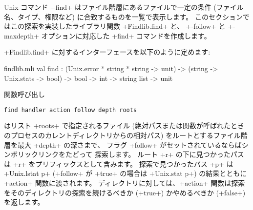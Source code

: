 Unix コマンド \ml+find+ はファイル階層にあるファイルで一定の条件 (ファイル名、タイプ、権限など)
に合致するものを一覧で表示します。
このセクションではこの探索を実装したライブラリ関数 \ml+Findlib.find+ と、
\ml+-follow+ と \ml+-maxdepth+ オプションに対応した \ml+find+ コマンドを作成します。

\ml+Findlib.find+ に対するインターフェースを以下のように定めます:
%
\begin{listingcodefile}{findlib.mli}
val find :
  (Unix.error * string * string -> unit) ->
  (string -> Unix.stats -> bool) -> bool -> int -> string list ->
  unit
\end{listingcodefile}
%
関数呼び出し
\begin{lstlisting}
find handler action follow depth roots
\end{lstlisting}
はリスト \ml+roots+ で指定されるファイル (絶対パスまたは関数が呼ばれたときのプロセスのカレントディレクトリからの相対パス)
をルートとするファイル階層を最大 \ml+depth+ の深さまで、 フラグ \ml+follow+ がセットされているならばシンボリックリンクをたどって
探索します。 ルート \ml+r+ の下に見つかったパスは \ml+r+ をプリフィックスとして含みます。
探索で見つかったパス \ml+p+ は \ml+Unix.lstat p+ (\ml+follow+ が \ml+true+ の場合は \ml+Unix.stat p+) の結果とともに
\ml+action+ 関数に渡されます。
ディレクトリに対しては、\ml+action+ 関数は探索をそのディレクトリの探索を続けるべきか
(\ml+true+) かやめるべきか (\ml+false+) を返します。

